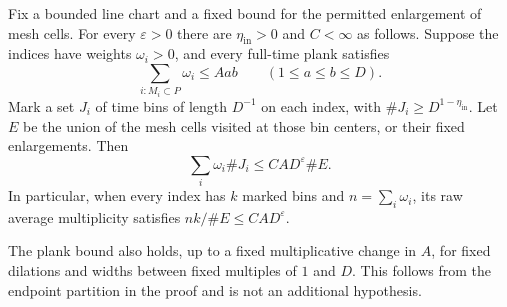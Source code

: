 \begin{lemma}\label{lem:weighted-set}
Fix a bounded line chart and a fixed bound for the permitted
enlargement of mesh cells. For every $\varepsilon>0$ there are
$\eta_{\mathrm{in}}>0$ and $C<\infty$ as follows. Suppose the indices have weights
$\omega_i>0$, and every full-time plank satisfies
\begin{equation}\label{eq:input-plank-bound}
 \sum_{i:M_i\subset P}\omega_i\le Aab
 \qquad(1\le a\le b\le D).
\end{equation}
Mark a set $J_i$ of
time bins of length $D^{-1}$ on each index, with
$\#J_i\ge D^{1-\eta_{\mathrm{in}}}$. Let $E$ be the union of the mesh cells
visited at those bin centers, or their fixed enlargements. Then
\begin{equation}\label{eq:weighted-chart-conclusion}
 \sum_i\omega_i\#J_i\le C A D^\varepsilon\#E.
\end{equation}
In particular, when every index has $k$ marked bins and
$n=\sum_i\omega_i$, its raw average multiplicity satisfies
$nk/\#E\le C A D^\varepsilon$.
\end{lemma}

The plank bound also holds, up to a fixed multiplicative change in
$A$, for fixed dilations and widths between fixed multiples of $1$
and $D$. This follows from the endpoint partition in the proof and
is not an additional hypothesis.

